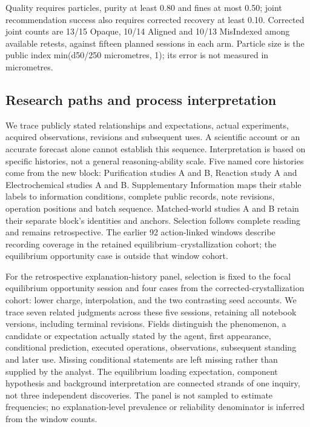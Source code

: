 \documentclass[12pt,a4paper]{article}
\begin{document}
Quality requires particles, purity at least 0.80 and fines at most 0.50; joint recommendation success also requires corrected recovery at least 0.10. Corrected joint counts are 13/15 Opaque, 10/14 Aligned and 10/13 MisIndexed among available retests, against fifteen planned sessions in each arm. Particle size is the public index min(d50/250 micrometres, 1); its error is not measured in micrometres.

\subsection{Research paths and process interpretation}\label{research-paths-and-process-interpretation}

We trace publicly stated relationships and expectations, actual experiments, acquired observations, revisions and subsequent uses. A scientific account or an accurate forecast alone cannot establish this sequence. Interpretation is based on specific histories, not a general reasoning-ability scale. Five named core histories come from the new block: Purification studies A and B, Reaction study A and Electrochemical studies A and B. Supplementary Information maps their stable labels to information conditions, complete public records, note revisions, operation positions and batch sequence. Matched-world studies A and B retain their separate block's identities and anchors. Selection follows complete reading and remains retrospective. The earlier 92 action-linked windows describe recording coverage in the retained equilibrium--crystallization cohort; the equilibrium opportunity case is outside that window cohort.

For the retrospective explanation-history panel, selection is fixed to the focal equilibrium opportunity session and four cases from the corrected-crystallization cohort: lower charge, interpolation, and the two contrasting seed accounts. We trace seven related judgments across these five sessions, retaining all notebook versions, including terminal revisions. Fields distinguish the phenomenon, a candidate or expectation actually stated by the agent, first appearance, conditional prediction, executed operations, observations, subsequent standing and later use. Missing conditional statements are left missing rather than supplied by the analyst. The equilibrium loading expectation, component hypothesis and background interpretation are connected strands of one inquiry, not three independent discoveries. The panel is not sampled to estimate frequencies; no explanation-level prevalence or reliability denominator is inferred from the window counts.
\end{document}
